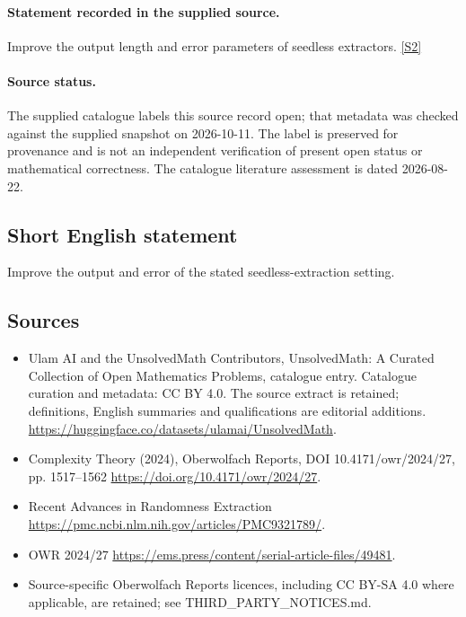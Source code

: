 \documentclass[11pt]{article}
\begin{document}
\paragraph{Statement recorded in the supplied source.}
Improve the output length and error parameters of seedless extractors. \href{https://doi.org/10.4171/owr/2024/27}{[S2]}
\paragraph{Source status.}
The supplied catalogue labels this source record open; that metadata was checked against the supplied snapshot on 2026-10-11. The label is preserved for provenance and is not an independent verification of present open status or mathematical correctness. The catalogue literature assessment is dated 2026-08-22.
\subsection{Short English statement}
Improve the output and error of the stated seedless-extraction setting.
\subsection{Sources}
\begin{itemize}
\item[S1] Ulam AI and the UnsolvedMath Contributors, UnsolvedMath: A Curated Collection of Open Mathematics Problems, catalogue entry. Catalogue curation and metadata: CC BY 4.0. The source extract is retained; definitions, English summaries and qualifications are editorial additions.
\url{https://huggingface.co/datasets/ulamai/UnsolvedMath}.
\item[S2] Complexity Theory (2024), Oberwolfach Reports, DOI 10.4171/owr/2024/27, pp. 1517--1562
\url{https://doi.org/10.4171/owr/2024/27}.
\item[S3] Recent Advances in Randomness Extraction
\url{https://pmc.ncbi.nlm.nih.gov/articles/PMC9321789/}.
\item[S4] OWR 2024/27
\url{https://ems.press/content/serial-article-files/49481}.
\item Source-specific Oberwolfach Reports licences, including CC BY-SA 4.0 where applicable, are retained; see THIRD\_PARTY\_NOTICES.md.
\end{itemize}
\end{document}
